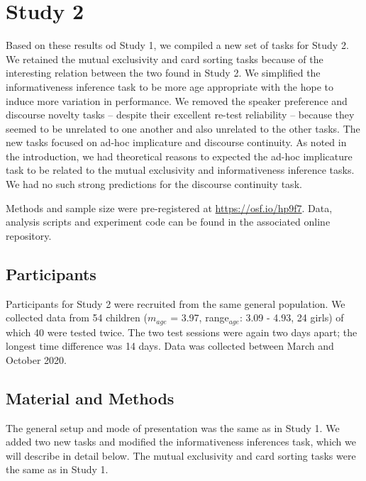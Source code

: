 \documentclass[
  english,
  man,floatsintext]{apa6}
\begin{document}
\hypertarget{study-2}{%
\section{Study 2}\label{study-2}}

Based on these results od Study 1, we compiled a new set of tasks for Study 2. We retained the mutual exclusivity and card sorting tasks because of the interesting relation between the two found in Study 2. We simplified the informativeness inference task to be more age appropriate with the hope to induce more variation in performance. We removed the speaker preference and discourse novelty tasks -- despite their excellent re-test reliability -- because they seemed to be unrelated to one another and also unrelated to the other tasks. The new tasks focused on ad-hoc implicature and discourse continuity. As noted in the introduction, we had theoretical reasons to expected the ad-hoc implicature task to be related to the mutual exclusivity and informativeness inference tasks. We had no such strong predictions for the discourse continuity task.

Methods and sample size were pre-registered at \url{https://osf.io/hp9f7}. Data, analysis scripts and experiment code can be found in the associated online repository.

\hypertarget{participants-1}{%
\subsection{Participants}\label{participants-1}}

Participants for Study 2 were recruited from the same general population. We collected data from 54 children (\(m_{age}\) = 3.97, range\(_{age}\): 3.09 - 4.93, 24 girls) of which 40 were tested twice. The two test sessions were again two days apart; the longest time difference was 14 days. Data was collected between March and October 2020.

\hypertarget{material-and-methods-1}{%
\subsection{Material and Methods}\label{material-and-methods-1}}

The general setup and mode of presentation was the same as in Study 1. We added two new tasks and modified the informativeness inferences task, which we will describe in detail below. The mutual exclusivity and card sorting tasks were the same as in Study 1.
\end{document}
